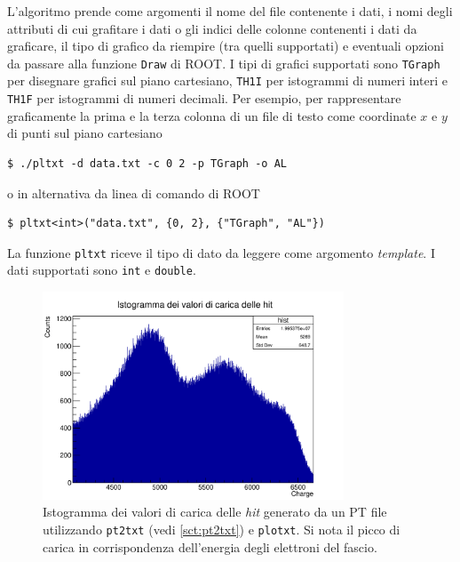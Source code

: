 \documentclass[../main.tex]{subfiles}
\begin{document}
L'algoritmo prende come argomenti il nome del file contenente i dati, i nomi degli attributi di cui grafitare i dati o gli indici delle colonne contenenti i dati da graficare, il tipo di grafico da riempire (tra quelli supportati) e eventuali opzioni da passare alla funzione \texttt{Draw} di ROOT. I tipi di grafici supportati sono \texttt{TGraph} per disegnare grafici sul piano cartesiano, \texttt{TH1I} per istogrammi di numeri interi e \texttt{TH1F} per istogrammi di numeri decimali.
Per esempio, per rappresentare graficamente la prima e la terza colonna di un file di testo come coordinate $x$ e $y$ di punti sul piano cartesiano
\begin{lstlisting}[frame=none]
$ ./pltxt -d data.txt -c 0 2 -p TGraph -o AL
\end{lstlisting}
o in alternativa da linea di comando di ROOT
\begin{lstlisting}[frame=none]
$ pltxt<int>("data.txt", {0, 2}, {"TGraph", "AL"})
\end{lstlisting}
La funzione \texttt{pltxt} riceve il tipo di dato da leggere come argomento \emph{template}. I dati supportati sono \texttt{int} e \texttt{double}. 

\begin{figure}[tb]
	\centering
	\includegraphics[width=0.8\textwidth]{c1-1.png}
    \caption{Istogramma dei valori di carica delle \emph{hit} generato da un PT file utilizzando \texttt{pt2txt} (vedi \autoref{sct:pt2txt}) e \texttt{plotxt}. Si nota il picco di carica in corrispondenza dell'energia degli elettroni del fascio.}
	\label{fig:histo}
\end{figure}
\end{document}
